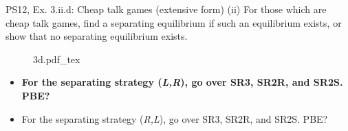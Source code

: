 \begin{frame}{PS12, Ex. 3.ii.d: Cheap talk games (extensive form)}
    (ii) For those which are cheap talk games, find a separating equilibrium if such an equilibrium exists, or show that no separating equilibrium exists.\vspace{-6pt}
    \begin{multicols}{2}
      \begin{figure}[!h]
        \center{}
        {3d.pdf_tex}
      \end{figure}\vspace{-6pt}
      \begin{itemize}
        \item[Step 1:] \textbf{For the separating strategy (\textit{L,R}), go over SR3, SR2R, and SR2S. PBE?}
        \item[Step 2:] For the separating strategy (\textit{R,L}), go over SR3, SR2R, and SR2S. PBE?
      \end{itemize}
      \vfill\null\columnbreak
      \vfill\null
    \end{multicols}
\end{frame}

